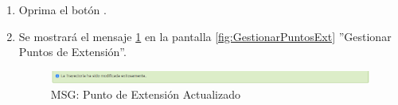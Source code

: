 \begin{enumerate}
			\item Oprima el botón \IUAceptar.
			
			\item Se mostrará el mensaje \ref{fig:pextModificada} en la pantalla \ref{fig:GestionarPuntosExt} ''Gestionar Puntos de Extensión''.
			
			\begin{figure}[htbp!]
				\begin{center}
					\includegraphics[scale=0.5]{roles/lider/puntosExtension/pantallas/IU6-1-4-2MSG1}
					\caption{MSG: Punto de Extensión Actualizado}
					\label{fig:pextModificada}
				\end{center}
			\end{figure}
			\end{enumerate}